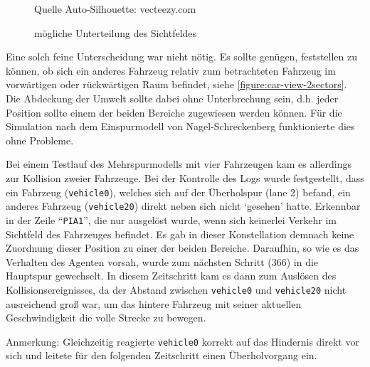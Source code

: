 \begin{figure}[hptb]
  \centering 
   \qquad 
   \qquad 
  \caption[mögliche Unterteilung des Sichtfeldes]
          {mögliche Unterteilung des Sichtfeldes}
          {\footnotesize Quelle Auto-Silhouette: vecteezy.com} 
  \label{figure:car-view-sectors}
\end{figure}

Eine solch feine Unterscheidung war nicht nötig.
Es sollte genügen, feststellen zu können, ob sich ein anderes Fahrzeug relativ zum betrachteten Fahrzeug im vorwärtigen oder rückwärtigen Raum befindet, siehe \cref{figure:car-view-2sectors}. 
Die Abdeckung der Umwelt sollte dabei ohne Unterbrechung sein, d.h. jeder Position sollte einem der beiden Bereiche zugewiesen werden können.
Für die Simulation nach dem Einspurmodell von Nagel-Schreckenberg funktionierte dies ohne Probleme.

Bei einem Testlauf des Mehrspurmodells mit vier Fahrzeugen kam es allerdings zur Kollision zweier Fahrzeuge. 
Bei der Kontrolle des Logs wurde festgestellt, dass ein Fahrzeug (\texttt{vehicle0}), welches sich auf der Überholspur (lane 2) befand, ein anderes Fahrzeug (\texttt{vehicle20}) direkt neben sich nicht \enquote*{gesehen} hatte. 
Erkennbar in der Zeile \enquote{\texttt{PIA1}}, die nur ausgelöst wurde, wenn sich keinerlei Verkehr im Sichtfeld des Fahrzeuges befindet.
Es gab in dieser Konstellation demnach keine Zuordnung dieser Position zu einer der beiden Bereiche.
Daraufhin, so wie es das Verhalten des Agenten vorsah, wurde zum nächsten Schritt (366) in die Hauptspur gewechselt. 
In diesem Zeitschritt kam es dann zum Auslösen des Kollisionsereignisses, da der Abstand zwischen \texttt{vehicle0} und \texttt{vehicle20} nicht ausreichend groß war, um das hintere Fahrzeug mit seiner aktuellen Geschwindigkeit die volle Strecke zu bewegen.

Anmerkung: Gleichzeitig reagierte \texttt{vehicle0} korrekt auf das Hindernis direkt vor sich und leitete für den folgenden Zeitschritt einen Überholvorgang ein.

